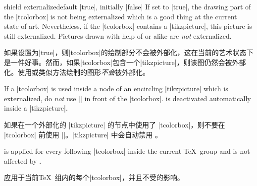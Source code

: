 \begin{docTcbKey}{shield externalize}{}{default |true|, initially |false|}
If set to |true|, the drawing part of the |tcolorbox| is not being externalized
which is a good thing at the current state of art. Nevertheless, if the
|tcolorbox| contains a |tikzpicture|, this picture is still externalized.
Pictures drawn with help of  or alike are \emph{not}
externalized.

如果设置为|true|，则|tcolorbox|的绘制部分不会被外部化，这在当前的艺术状态下是一件好事。然而，如果|tcolorbox|包含一个|tikzpicture|，则该图仍然会被外部化。使用或类似方法绘制的图形\emph{不会}被外部化。

\end{docTcbKey}

\begin{marker}
If a |tcolorbox| is used inside a node of an encircling |tikzpicture| which is externalized,
do \emph{not} use |\tikzexternaldisable| in front of the |tcolorbox|.
 is deactivated automatically inside a |tikzpicture|.

如果在一个外部化的 |tikzpicture| 的节点中使用了 |tcolorbox|，则不要在 |tcolorbox| 前使用 |\tikzexternaldisable|。|tikzpicture| 中会自动禁用 。
\end{marker}



\begin{marker}
 is applied for every following |tcolorbox|
inside the current \TeX\ group and is not affected by .

应用于当前\TeX\ 组内的每个|tcolorbox|，并且不受的影响。
\end{marker}

